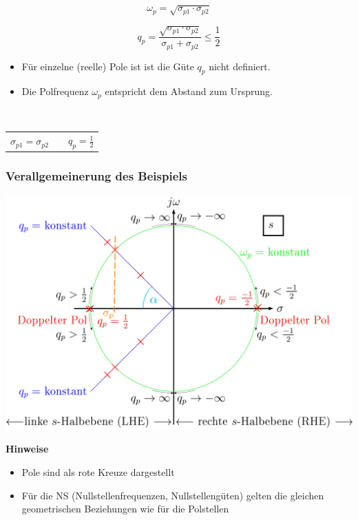 \begin{minipage}[c]{0.48\columnwidth}
    $$ \boxed{ \omega_p = \sqrt{\sigma_{p1} \cdot \sigma_{p2} } } $$
\end{minipage}
\hfill
\begin{minipage}[c]{0.48\columnwidth}
    $$ \boxed{ q_p =  \frac{\sqrt{\sigma_{p1} \cdot \sigma_{p2}}}{\sigma_{p1} + \sigma_{p2}} \leq \frac{1}{2} } $$
\end{minipage}

\begin{itemize}
    \item[\textrightarrow] Für einzelne (reelle) Pole ist ist die Güte $q_p$ nicht definiert.
    \item[\textrightarrow] Die Polfrequenz $\omega_p$ entspricht dem Abstand zum Ursprung.
\end{itemize}

\textbf{} \\ %
\begin{tabular}{c c c}
    $\sigma_{p1} = \sigma_{p2}$ & & $q_p = \frac{1}{2}$
\end{tabular}


\subsubsection{Verallgemeinerung des Beispiels}
\begin{minipage}[c]{0.55\columnwidth}
    \includegraphics[width=\columnwidth]{images/pole_nullstellen_koeffizienten.png}
\end{minipage}
\hfill
\begin{minipage}[c]{0.42\columnwidth}
    \raggedright%
    \textbf{Hinweise}
    \begin{itemize}
        \item Pole sind als rote Kreuze dargestellt
        \item Für die NS (Nullstellenfrequenzen, Nullstellengüten) gelten die gleichen
            geometrischen Beziehungen wie für die Polstellen
    \end{itemize}
\end{minipage}




